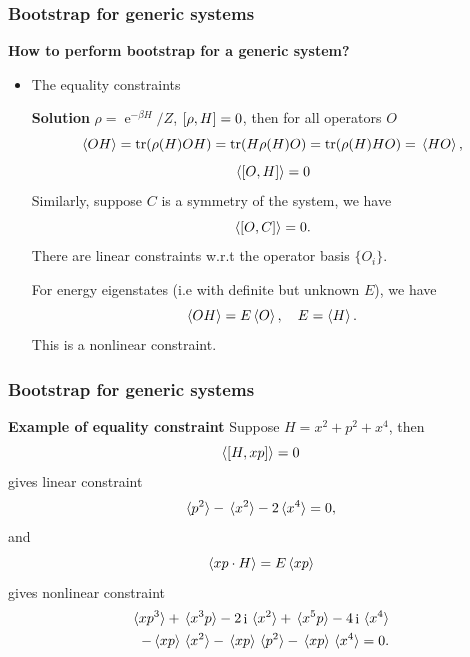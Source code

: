\documentclass{beamer}
\DeclareMathOperator{\ee}{e}
\DeclareMathOperator{\ii}{i}
\begin{document}
\begin{frame}
\frametitle{Bootstrap for generic systems}

\textbf{How to perform bootstrap for a generic system?}  

\begin{itemize}
    \item The equality constraints

    \textbf{Solution} $\rho = \ee^{- \beta H} / Z$, $\comm{\rho}{H} = 0$, then for all operators $O$
    \[
        \expval*{O H} = \trace (\rho(H) O H) = \trace(H \rho(H) O) = \trace(\rho(H) H O)  = \expval*{H {O}},
    \]
    \begin{equation}
        \expval*{\comm{O}{H}} = 0
    \end{equation}
    Similarly, suppose $C$ is a symmetry of the system, we have 
    \begin{equation}
        \expval*{\comm{O}{C}} = 0.
    \end{equation}
    There are linear constraints w.r.t the operator basis $\{O_i\}$.

    For energy eigenstates (i.e with definite but unknown $E$), we have 
    \begin{equation}
        \expval{O H} = E \expval{O}, \quad E = \expval{H}.
    \end{equation}
    This is a nonlinear constraint.
\end{itemize}

\end{frame}

\begin{frame}
\frametitle{Bootstrap for generic systems}

\textbf{Example of equality constraint} Suppose $H = x^2 + p^2 + x^4$, then 
\[
    \expval*{\comm{H}{xp}} = 0
\]    
gives linear constraint
\begin{equation}
    \expval*{p^2} - \expval*{x^2} - 2 \expval*{x^4} = 0,
\end{equation}
and 
\[
    \expval*{xp \cdot H} = E \expval*{xp}
\]
gives nonlinear constraint
\begin{equation}
    \begin{aligned}
        \expval*{xp^3} + \expval*{x^3 p} - 2 \ii \expval*{x^2} + \expval*{x^5 p} - 4 \ii \expval*{x^4} \\
        - \expval*{xp} \expval*{x^2} - \expval*{xp} \expval*{p^2} - \expval*{xp} \expval*{x^4} = 0.
    \end{aligned}
\end{equation}

\end{frame}
\end{document}
